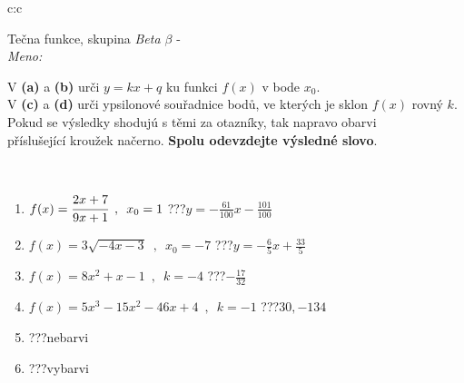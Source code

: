 \documentclass[10pt]{report}
\begin{document}
\newpage
\thispagestyle{empty}
\begin{tabular}{c:c}
\begin{minipage}[c][104.5mm][t]{0.5\linewidth}
\begin{center}
\vspace{7mm}
{\huge Tečna funkce, skupina \textit{Beta $\beta$} -}\\[5mm]
\textit{Meno:}\phantom{xxxxxxxxxxxxxxxxxxxxxxxxxxxxxxxxxxxxxxxxxxxxxxxxxxxxxxxxxxxxxxxxx}\\[5mm]
\begin{minipage}{0.95\linewidth}
\begin{center}
V \textbf{(a)} a \textbf{(b)} urči  $y = kx + q$ ku funkci $f(x)$ v bode $x_0$.\\V \textbf{(c)} a \textbf{(d)} urči ypsilonové souřadnice bodů, ve kterých je sklon $f(x)$ rovný $k$.\\Pokud se výsledky shodujú s těmi za otazníky, tak napravo obarvi\\příslušející kroužek načerno. \textbf{Spolu odevzdejte výsledné slovo}.
\end{center}
\end{minipage}
\\[1mm]
\begin{minipage}{0.79\linewidth}
\begin{center}
\begin{varwidth}{\linewidth}
\begin{enumerate}
\small
\item $f(x)=\cfrac{2x+7}{9x+1}\enspace , \enspace x_0=1$\quad \dotfill\; ???\;\dotfill \quad $y = -\frac{61}{100}x-\frac{101}{100}$
\item $f(x)=3\sqrt{-4x-3}\enspace , \enspace x_0=-7$\quad \dotfill\; ???\;\dotfill \quad $y = -\frac{6}{5}x+\frac{33}{5}$
\item $f(x)=8x^2+x-1\enspace , \enspace k=-4$\quad \dotfill\; ???\;\dotfill \quad $-\frac{17}{32}$
\item $f(x)=5x^3-15x^2-46x+4\enspace , \enspace k=-1$\quad \dotfill\; ???\;\dotfill \quad $30 , -134$
\item \quad \dotfill\; ???\;\dotfill \quad nebarvi
\item \quad \dotfill\; ???\;\dotfill \quad vybarvi
\end{enumerate}
\end{varwidth}
\end{center}
\end{minipage}
\begin{minipage}{0.20\linewidth}

\end{minipage}
\end{center}
\end{minipage}
\end{tabular}
\end{document}
